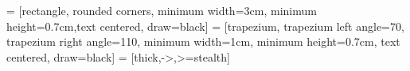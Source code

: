 \usepackage{tikz}
\usetikzlibrary{shapes.geometric, arrows}

 = [rectangle, rounded corners, minimum width=3cm, minimum height=0.7cm,text centered, draw=black]
 = [trapezium, trapezium left angle=70, trapezium right angle=110, minimum width=1cm,  minimum height=0.7cm, text centered, draw=black]
 = [thick,->,>=stealth]

\newcommand*\circled[1]{\tikz[baseline=(char.base)]{
            \node[shape=circle,draw,inner sep=1pt] (char) {#1};}}

\usepackage[pages=some]{background}


\usepackage{makeidx}
\makeindex

\newcommand{\monthyear}{%
  \ifcase\month\or January\or February\or March\or April\or May\or June\or
  July\or August\or September\or October\or November\or
  December\fi\space\number\year
}

\newenvironment{docspec}{\begin{quotation}\ttfamily\parskip0pt\parindent0pt\ignorespaces}{\end{quotation}}%


\newcommand{\openepigraph}[2]{%
  \begin{fullwidth}
  \sffamily\large
  \begin{doublespace}
  \noindent\allcaps{#1}\\%
  \noindent\allcaps{#2}%
  \end{doublespace}
  \end{fullwidth}
}

